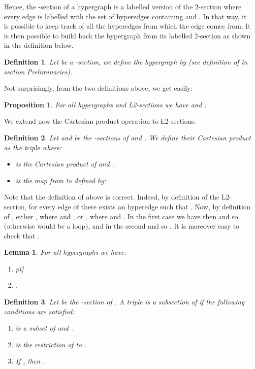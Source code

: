 \documentclass[copyright]{eptcs}
\newtheorem{Def}{Definition}
\newtheorem{Lem}{Lemma}
\newtheorem{Prop}{Proposition}
\newcommand{\chg}[1]{{#1}}
\begin{document}
Hence, the -section of a hypergraph is a labelled version of the 2-section where every edge  is labelled with the set of hyperedges containing  and . In that way, it is possible to keep track of all the hyperedges from which the edge  comes from. It is then possible to build back the hypergraph from its labelled 2-section as shown in the definition below.

\begin{Def}\label{DfL2SectionToHypergraph} Let  be a -section, we define the hypergraph  by (see definition of  in section
Preliminaries).
\end{Def}

\noindent Not surprisingly, from the two definitions above, we get easily:

\begin{Prop}\label{PrInjectivityL2} For all hypergraphs  and L2-sections  we have
 and .
\end{Prop}

We extend now the Cartesian product operation to L2-sections.


\begin{Def}\label{DfProductLabeledGraph} Let  and  be the -sections of  and . We define their Cartesian product  as the triple  where:
\begin{itemize}
 \item  is the Cartesian product of  and .
 \item  is the map from  to  defined by:

\end{itemize}
\end{Def}

Note that the definition of  above is
correct. Indeed, by definition of the L2-section, for every edge
 of  there exists an hyperedge
 such that . Now, by definition of , either
, where  and ,
or , where  and . In the first case we have then  and so 
(otherwise  would be a loop), and in the second
 and so . It is moreover easy to check that .

\begin{Lem}\label{LemSCommuteWithCartesian} For all hypergraphs  we have:
\begin{enumerate}
\item \2pt]
\item .
\end{enumerate}
\end{Lem}


\begin{Def}\label{DfSubsection} Let  be the -section of . A triple  is a \emph{subsection} of  if the following conditions are satisfied:
\begin{enumerate}
\item \chg{ is a subset of  and .}
\item  is the restriction of  to . \item
\chg{If , then .}
\end{enumerate}
\end{Def}
\end{document}
